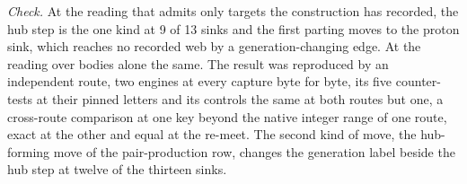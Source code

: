 \begin{chproof}
\emph{Check.} At the reading that admits only targets the construction has recorded, the hub step is the one kind at 9 of 13 sinks and the first parting moves to the proton sink, which reaches no recorded web by a generation-changing edge. At the reading over bodies alone the same. The result was reproduced by an independent route, two engines at every capture byte for byte, its five counter-tests at their pinned letters and its controls the same at both routes but one, a cross-route comparison at one key beyond the native integer range of one route, exact at the other and equal at the re-meet.
The second kind of move, the hub-forming move of the pair-production row, changes the generation label beside the hub step at twelve of the thirteen sinks.
\end{chproof}
\label{chend:VI-4-D538994-w-cchs}

